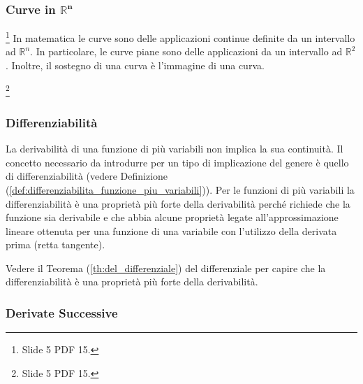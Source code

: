 \subsubsection{Curve in \texorpdfstring{$\boldsymbol{\mathbb R^n}$}{Rn}}\label{ssec:curve_Rn}\footnote{Slide 5 PDF 15.}
In matematica le curve sono delle applicazioni continue definite da un intervallo ad $\mathbb R^n$. In particolare, le curve piane sono delle applicazioni da un intervallo ad $\mathbb R^2$. Inoltre, il sostegno di una curva è l'immagine di una curva.
\begin{definition}
	\footnote{Slide 5 PDF 15.}
\end{definition}

\subsubsection{Differenziabilità}
La derivabilità di una funzione di più variabili non implica la sua continuità. Il concetto necessario da introdurre per un tipo di implicazione del genere è quello di differenziabilità (vedere Definizione (\ref{def:differenziabilita_funzione_piu_variabili})). Per le funzioni di più variabili la differenziabilità è una proprietà più forte della derivabilità perché richiede che la funzione sia derivabile e che abbia alcune proprietà legate all'approssimazione lineare ottenuta per una funzione di una variabile con l'utilizzo della derivata prima (retta tangente).

Vedere il Teorema (\ref{th:del_differenziale}) del differenziale per capire che la differenziabilità è una proprietà più forte della derivabilità.

\subsubsection{Derivate Successive}
